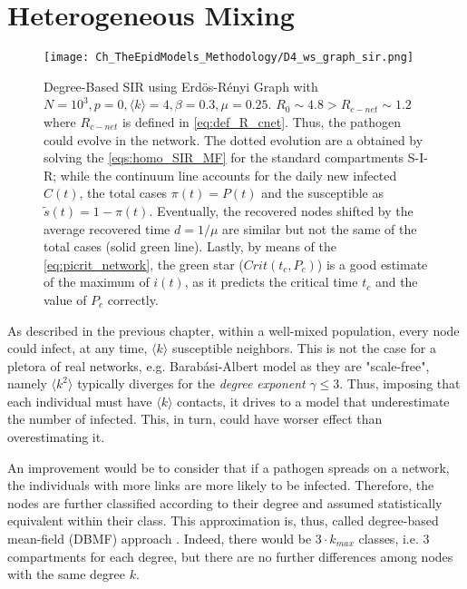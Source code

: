 \documentclass[a4paper,10pt,twoside]{book} %
\theoremstyle{definition}
\begin{document}
\newpage
\section{Heterogeneous Mixing}
\label{sec:degree-basedMF}
\begin{figure}[ht]
	\texttt{[image: Ch\_TheEpidModels\_Methodology/D4\_ws\_graph\_sir.png]}
	\caption{Degree-Based SIR using Erdös-Rényi Graph with $N = 10^{3}, p = 0, \langle k \rangle = 4, \beta = 0.3, \mu = 0.25$. $R_0 \sim 4.8 > R_{c-net} \sim 1.2$ where $R_{c-net}$ is defined in \autoref{eq:def_R_cnet}. Thus, the pathogen could evolve in the network. The dotted evolution are a obtained by solving the \autoref{eqs:homo_SIR_MF} for the standard compartments S-I-R; while the continuum line accounts for the daily new infected $ C(t)$, the total cases $ \pi(t) = P(t)$ and the susceptible as $ \tilde{s}(t) = 1 - \pi(t)$. Eventually, the recovered nodes shifted by the average recovered time $d = 1/ \mu$ are similar but not the same of the total cases (solid green line). Lastly, by means of the \autoref{eq:picrit_network}, the green star ($Crit (t_c,P_c)$) is a good estimate of the maximum of $ i(t)$, as it predicts the critical time $ t_c$ and the value of $P_c$ correctly.}
	\label{fig:DB_SIR}
\end{figure}
As described in the previous chapter, within a well-mixed population, every node could infect, at any time, $\langle k \rangle$ susceptible neighbors. This is not the case for a pletora of real networks, e.g. Barabási-Albert model as they are "scale-free", namely $\langle k^2 \rangle$ typically diverges for the \textit{degree exponent} $\gamma \leq 3$. Thus, imposing that each individual must have $\langle k \rangle$ contacts, it drives to a model that underestimate the number of infected. This, in turn, could have worser effect than overestimating it.

An improvement would be to consider that if a pathogen spreads on a network, the individuals with more links are more likely to be infected. Therefore, the nodes are further classified according to their degree and assumed statistically equivalent within their class. This approximation is, thus, called degree-based mean-field (DBMF) approach \cite{barabasi::2016networkbook}. Indeed, there would be $3 \cdot k_{max}$ classes, i.e. $3$ compartments for each degree, but there are no further differences among nodes with the same degree $k$. 
\end{document}

